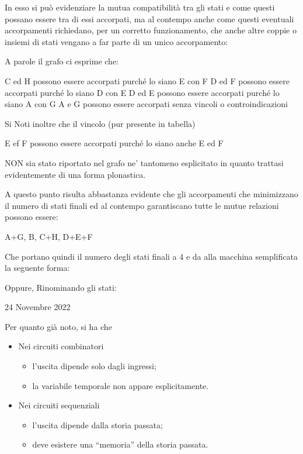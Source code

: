 \documentclass[a4paper]{extarticle}
\newcommand{\quotes}[1]{``#1''}
\begin{document}
In esso si può evidenziare la mutua compatibilità tra gli stati e come questi possano essere tra di essi accorpati, ma al contempo anche come questi eventuali accorpamenti  richiedano, per un corretto funzionamento, che anche altre coppie o insiemi di stati vengano a far parte di un unico accorpamento:

A parole il grafo ci esprime che:

C ed H possono essere accorpati purché lo siano E con F
D ed F possono essere accorpati purché lo siano D con E
D ed E possono essere accorpati purché lo siano A con G
A e G possono essere accorpati senza vincoli o controindicazioni

Si Noti inoltre che il vincolo (pur presente in tabella)

E ef F  possono essere accorpati purché lo siano anche E ed F 

NON sia stato riportato nel grafo ne’ tantomeno esplicitato in quanto trattasi evidentemente di una forma plonastica.

A questo punto risulta abbastanza evidente che gli accorpamenti che minimizzano il numero di stati finali ed al contempo garantiscano tutte le mutue relazioni possono essere:

A+G, B, C+H, D+E+F

Che portano quindi il numero degli stati finali a 4 e da alla macchina semplificata la seguente forma:



Oppure, Rinominando gli stati:








\newpage
\begin{center}
    24 Novembre 2022
\end{center}
Per quanto già noto, si ha che
\begin{itemize}
    \item Nei circuiti combinatori
    \begin{itemize}
        \item l'uscita dipende solo dagli ingressi;
        \item la variabile temporale non appare esplicitamente.
    \end{itemize}
    \item Nei circuiti sequenziali
    \begin{itemize}
        \item l'uscita dipende dalla storia passata;
        \item deve esistere una \quotes{memoria} della storia passata.
    \end{itemize}
\end{itemize}
\end{document}
